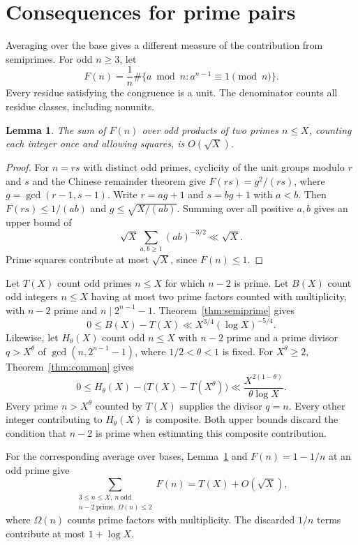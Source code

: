 \documentclass[11pt]{article}
\newtheorem{lemma}[theorem]{Lemma}
\begin{document}
\section{Consequences for prime pairs}

Averaging over the base gives a different measure of the contribution
from semiprimes. For odd \(n\ge3\), let
\[
   F(n)=\frac1n\#\{a\bmod n:a^{n-1}\equiv1\pmod n\}.
\]
Every residue satisfying the congruence is a unit. The denominator
counts all residue classes, including nonunits.

\begin{lemma}\label{lem:average}
The sum of \(F(n)\) over odd products of two primes \(n\le X\),
counting each integer once and allowing squares, is \(O(\sqrt X)\).
\end{lemma}

\begin{proof}
For \(n=rs\) with distinct odd primes, cyclicity of the unit groups
modulo \(r\) and \(s\) and the Chinese remainder theorem give
\(F(rs)=g^2/(rs)\), where \(g=\gcd(r-1,s-1)\).
Write \(r=ag+1\) and \(s=bg+1\) with \(a<b\). Then
\(F(rs)\le1/(ab)\) and \(g\le\sqrt{X/(ab)}\). Summing
over all positive \(a,b\) gives an upper bound of
\[
   \sqrt X\sum_{a,b\ge1}(ab)^{-3/2}\ll\sqrt X.
\]
Prime squares contribute at most \(\sqrt X\), since \(F(n)\le1\).
\end{proof}

Let \(T(X)\) count odd primes \(n\le X\) for which \(n-2\) is
prime. Let \(B(X)\) count odd integers \(n\le X\) having at most
two prime factors counted with multiplicity, with \(n-2\) prime
and \(n\mid 2^{n-1}-1\). Theorem~\ref{thm:semiprime} gives
\[
             0\le B(X)-T(X)\ll X^{3/4}(\log X)^{-5/4}.
\]
Likewise, let \(H_{\theta}(X)\) count odd \(n\le X\) with
\(n-2\) prime and a prime divisor \(q>X^\theta\) of
\(\gcd(n,2^{n-1}-1)\), where \(1/2<\theta<1\) is fixed.
For \(X^\theta\ge2\), Theorem~\ref{thm:common} gives
\[
 0\le H_{\theta}(X)-\bigl(T(X)-T(X^\theta)\bigr)
          \ll \frac{X^{2(1-\theta)}}{\theta\log X}.
\]
Every prime \(n>X^\theta\) counted by \(T(X)\) supplies the divisor
\(q=n\). Every other integer contributing to \(H_\theta(X)\)
is composite. Both upper bounds discard the condition that \(n-2\)
is prime when estimating this composite contribution.

For the corresponding average over bases, Lemma~\ref{lem:average}
and \(F(n)=1-1/n\) at an odd prime give
\[
  \sum_{\substack{3\le n\le X,\ n\ \mathrm{odd}\\
                n-2\ \mathrm{prime},\ \Omega(n)\le2}} F(n)
       =T(X)+O(\sqrt X),
\]
where \(\Omega(n)\) counts prime factors with multiplicity.
The discarded \(1/n\) terms contribute at most \(1+\log X\).
\end{document}
